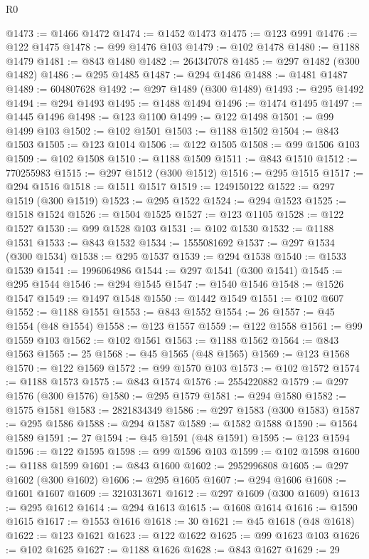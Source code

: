 \begin{lexlean}{R0}
\begin{coremodule}
@1473 := @1466 @1472
@1474 := @1452 @1473
@1475 := @123 @991
@1476 := @122 @1475
@1478 := @99 @1476 @103
@1479 := @102 @1478
@1480 := @1188 @1479
@1481 := @843 @1480
@1482 := 264347078
@1485 := @297 @1482 (@300 @1482)
@1486 := @295 @1485
@1487 := @294 @1486
@1488 := @1481 @1487
@1489 := 604807628
@1492 := @297 @1489 (@300 @1489)
@1493 := @295 @1492
@1494 := @294 @1493
@1495 := @1488 @1494
@1496 := @1474 @1495
@1497 := @1445 @1496
@1498 := @123 @1100
@1499 := @122 @1498
@1501 := @99 @1499 @103
@1502 := @102 @1501
@1503 := @1188 @1502
@1504 := @843 @1503
@1505 := @123 @1014
@1506 := @122 @1505
@1508 := @99 @1506 @103
@1509 := @102 @1508
@1510 := @1188 @1509
@1511 := @843 @1510
@1512 := 770255983
@1515 := @297 @1512 (@300 @1512)
@1516 := @295 @1515
@1517 := @294 @1516
@1518 := @1511 @1517
@1519 := 1249150122
@1522 := @297 @1519 (@300 @1519)
@1523 := @295 @1522
@1524 := @294 @1523
@1525 := @1518 @1524
@1526 := @1504 @1525
@1527 := @123 @1105
@1528 := @122 @1527
@1530 := @99 @1528 @103
@1531 := @102 @1530
@1532 := @1188 @1531
@1533 := @843 @1532
@1534 := 1555081692
@1537 := @297 @1534 (@300 @1534)
@1538 := @295 @1537
@1539 := @294 @1538
@1540 := @1533 @1539
@1541 := 1996064986
@1544 := @297 @1541 (@300 @1541)
@1545 := @295 @1544
@1546 := @294 @1545
@1547 := @1540 @1546
@1548 := @1526 @1547
@1549 := @1497 @1548
@1550 := @1442 @1549
@1551 := @102 @607
@1552 := @1188 @1551
@1553 := @843 @1552
@1554 := 26
@1557 := @45 @1554 (@48 @1554)
@1558 := @123 @1557
@1559 := @122 @1558
@1561 := @99 @1559 @103
@1562 := @102 @1561
@1563 := @1188 @1562
@1564 := @843 @1563
@1565 := 25
@1568 := @45 @1565 (@48 @1565)
@1569 := @123 @1568
@1570 := @122 @1569
@1572 := @99 @1570 @103
@1573 := @102 @1572
@1574 := @1188 @1573
@1575 := @843 @1574
@1576 := 2554220882
@1579 := @297 @1576 (@300 @1576)
@1580 := @295 @1579
@1581 := @294 @1580
@1582 := @1575 @1581
@1583 := 2821834349
@1586 := @297 @1583 (@300 @1583)
@1587 := @295 @1586
@1588 := @294 @1587
@1589 := @1582 @1588
@1590 := @1564 @1589
@1591 := 27
@1594 := @45 @1591 (@48 @1591)
@1595 := @123 @1594
@1596 := @122 @1595
@1598 := @99 @1596 @103
@1599 := @102 @1598
@1600 := @1188 @1599
@1601 := @843 @1600
@1602 := 2952996808
@1605 := @297 @1602 (@300 @1602)
@1606 := @295 @1605
@1607 := @294 @1606
@1608 := @1601 @1607
@1609 := 3210313671
@1612 := @297 @1609 (@300 @1609)
@1613 := @295 @1612
@1614 := @294 @1613
@1615 := @1608 @1614
@1616 := @1590 @1615
@1617 := @1553 @1616
@1618 := 30
@1621 := @45 @1618 (@48 @1618)
@1622 := @123 @1621
@1623 := @122 @1622
@1625 := @99 @1623 @103
@1626 := @102 @1625
@1627 := @1188 @1626
@1628 := @843 @1627
@1629 := 29

\end{coremodule}
\end{lexlean}
